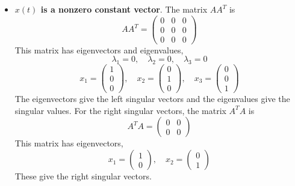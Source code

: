 \documentclass{article}
\begin{document}
\begin{itemize}
  
  \item {\bf $x(t)$ is a nonzero constant vector}. The matrix $A A^T$ is
  $$ A A^T = \begin{pmatrix}
    0 & 0 & 0 \\
    0 & 0 & 0 \\
    0 & 0 & 0
  \end{pmatrix} $$
  This matrix has eigenvectors and eigenvalues,
  $$ \lambda_1 = 0,\quad \lambda_2 = 0,\quad \lambda_3 = 0 $$
  $$ x_1 = \begin{pmatrix}
    1 \\
    0 \\
    0
  \end{pmatrix},\quad x_2 = \begin{pmatrix}
    0 \\
    1 \\
    0
  \end{pmatrix},\quad x_3 = \begin{pmatrix}
    0 \\
    0 \\
    1
  \end{pmatrix} $$
  The eigenvectors give the left singular vectors and the eigenvalues give
  the singular values. For the right singular vectors, the matrix $A^T A$ is
  $$ A^T A = \begin{pmatrix}
    0 & 0 \\
    0 & 0
  \end{pmatrix} $$
  This matrix has eigenvectors,
  $$ x_1 = \begin{pmatrix}
    1 \\
    0
  \end{pmatrix},\quad x_2 = \begin{pmatrix}
    0 \\
    1
  \end{pmatrix} $$
  These give the right singular vectors.


\end{itemize}
\end{document}
